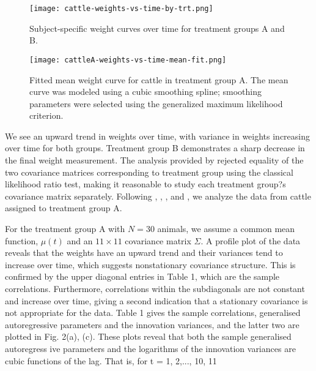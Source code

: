 \documentclass[12pt]{article}
\theoremstyle{definition}
\begin{document}
\begin{figure}[h] \label{fig:cattle-weights-by-trt}
\caption{Subject-specific weight curves over time for treatment groups A and B.}
\centering
\texttt{[image: cattle-weights-vs-time-by-trt.png]}
\end{figure} 

\begin{figure}[h] \label{fig:cattleA-weights-fitted-mean-curve}
\caption{Fitted mean weight curve for cattle in treatment group A. The mean curve was modeled using a cubic smoothing spline; smoothing parameters were selected using the generalized maximum likelihood criterion.}
\centering
\texttt{[image: cattleA-weights-vs-time-mean-fit.png]}
\end{figure} 

We see an upward trend in weights over time, with variance in weights increasing over time for both groups. Treatment group B demonstrates a sharp decrease in the final weight measurement. The analysis provided by \citet{zimmerman1997structured} rejected equality of the two covariance matrices corresponding to treatment group using the classical likelihood ratio test, making it reasonable to study each treatment group?s covariance matrix separately. Following \citet{pan2017jmcm}, \citet{zhang2015joint}, \citet{pourahmadi1999joint}, and \citet{pan2006regression}, we analyze the data from cattle assigned to treatment group A. 

For the treatment group A with $N = 30$ animals, we assume a common mean function, $\mu\left(t\right)$ and an $11 \times 11$ covariance matrix $\Sigma$. A profile plot of the data reveals that the weights have an upward trend and their variances tend to increase over time, which suggests nonstationary covariance structure. This is confirmed by the upper diagonal entries in Table 1, which are the sample correlations. Furthermore, correlations within the subdiagonals are not constant and increase over time, giving a second indication that a stationary covariance is not appropriate for the data. Table 1 gives the sample correlations,  generalised autoregressive parameters and the innovation variances, and the latter two are plotted in Fig. 2(a), (c). These plots reveal that both the sample generalised autoregress
ive parameters and the logarithms of the innovation variances are cubic functions of the lag. That is, for t = 1, 2,..., 10, 11
\end{document}
